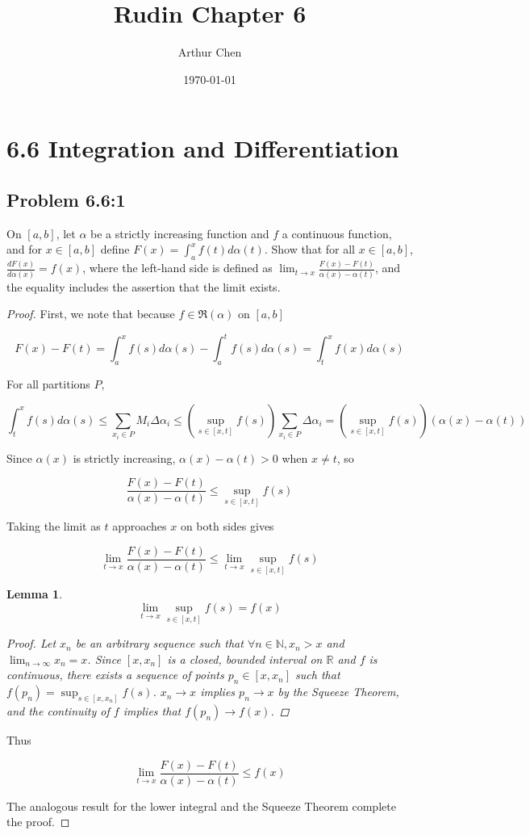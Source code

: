\documentclass{amsart}
\author{Arthur Chen}
\title{Rudin Chapter 6}
\date{\today}
\newcommand{\RiemannIntable}{
  \mathfrak{R}
}
\newtheorem{lemma}{Lemma}[subsubsection]
\begin{document}
\section*{6.6 Integration and Differentiation}

\subsection*{Problem 6.6:1}

On $[a, b]$, let $\alpha$ be a strictly increasing function and $f$ a continuous function, and for $x \in [a, b]$ define $F(x) = \int_a^x f(t) d\alpha(t)$. Show that for all $x \in [a, b]$, $\frac{dF(x)}{d \alpha(x)} = f(x)$, where the left-hand side is defined as $\lim_{t \to x} \frac{F(x) - F(t)}{\alpha(x) - \alpha(t)}$, and the equality includes the assertion that the limit exists.

\begin{proof}

First, we note that because $f \in \RiemannIntable(\alpha)$ on $[a, b]$

\[F(x) - F(t) = \int_a^x f(s)d\alpha(s) - \int_a^t f(s) d\alpha(s) = \int_t^x f(x) d\alpha(s)
\]

For all partitions $P$,

\[
\int_t^x f(s) d\alpha(s)
\leq \sum_{x_i \in P} M_i \Delta \alpha_i
\leq \left(\sup_{s \in [x, t]} f(s) \right) \sum_{x_i \in P} \Delta \alpha_i
= \left(\sup_{s \in [x, t]} f(s) \right) (\alpha(x) - \alpha(t))
\]

Since $\alpha(x)$ is strictly increasing, $\alpha(x) - \alpha(t) > 0$ when $x \neq t$, so

\[
\frac{F(x) - F(t)}{\alpha(x) - \alpha(t)} \leq \sup_{s \in [x, t]} f(s)
\]

Taking the limit as $t$ approaches $x$ on both sides gives

\[
\lim_{t \to x} \frac{F(x) - F(t)}{\alpha(x) - \alpha(t)} \leq \lim_{t \to x} \sup_{s \in [x, t]} f(s)
\]

\begin{lemma}

\[
\lim_{t \to x} \sup_{s \in [x, t]} f(s) = f(x)
\]

\begin{proof}

Let $x_n$ be an arbitrary sequence such that $\forall n \in \mathbb{N}, x_n > x$ and $\lim_{n \to \infty} x_n = x$. Since $[x, x_n]$ is a closed, bounded interval on $\mathbb{R}$ and $f$ is continuous, there exists a sequence of points $p_n \in [x, x_n]$ such that $f(p_n) =  \sup_{s \in [x, x_n]} f(s)$. $x_n \rightarrow x$ implies $p_n \rightarrow x$ by the Squeeze Theorem, and the continuity of $f$ implies that $f(p_n) \rightarrow f(x)$.

\end{proof}
\end{lemma}

Thus

\[
\lim_{t \to x} \frac{F(x) - F(t)}{\alpha(x) - \alpha(t)} \leq f(x)
\]

The analogous result for the lower integral and the Squeeze Theorem complete the proof.

\end{proof}
\end{document}
